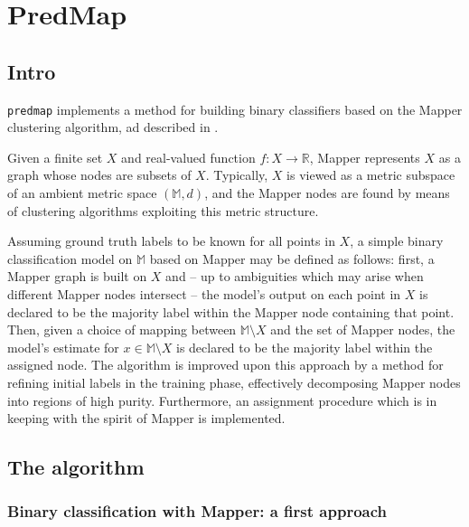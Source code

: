 \section{PredMap}
\subsection{Intro}

\lstinline|predmap| implements a method for building binary classifiers based on the Mapper clustering algorithm, ad described in \cite{palma}.

Given a finite set $X$ and real-valued function $f : X \to \mathbb{R}$, Mapper represents $X$ as a graph whose nodes are subsets of $X$.  Typically, $X$ is viewed as a metric subspace of an ambient metric space $(\mathbb{M}, d)$, and the Mapper nodes are found by means of clustering algorithms exploiting this metric structure.

Assuming ground truth labels to be known for all points in $X$, a simple binary classification model on $\mathbb{M}$ based on Mapper may be defined as follows: first, a Mapper graph is built on $X$ and -- up to ambiguities which may arise when different Mapper nodes intersect -- the model's output on each point in $X$ is declared to be the majority label within the Mapper node containing that point.  Then, given a choice of mapping between $\mathbb{M} \setminus X$ and the set of Mapper nodes, the model's estimate for $x \in \mathbb{M} \setminus X$ is declared to be the majority label within the assigned node. The algorithm is improved upon this approach by a method for refining initial labels in the training phase, effectively decomposing Mapper nodes into regions of high purity. Furthermore, an assignment procedure which is in keeping with the spirit of Mapper is implemented.

\subsection{The algorithm}\label{sec:a first approach}

\subsubsection*{Binary classification with Mapper: a first approach}

